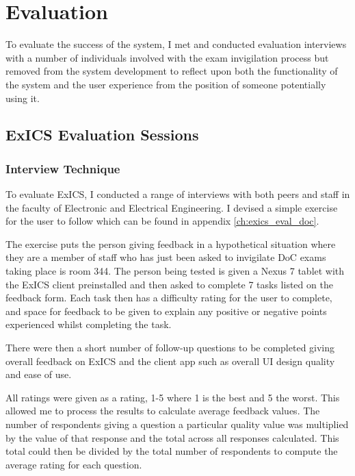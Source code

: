 \chapter{Evaluation}
\label{ch:eval}

To evaluate the success of the system, I met and conducted evaluation interviews with a number of individuals involved with the exam invigilation process but removed from the system development to reflect upon both the functionality of the system and the user experience from the position of someone potentially using it.

\section{ExICS Evaluation Sessions}

\subsection{Interview Technique}

To evaluate ExICS, I conducted a range of interviews with both peers and staff in the faculty of Electronic and Electrical Engineering.  I devised a simple exercise for the user to follow which can be found in appendix \ref{ch:exics_eval_doc}.

The exercise puts the person giving feedback in a hypothetical situation where they are a member of staff who has just been asked to invigilate DoC exams taking place is room 344.  The person being tested is given a Nexus 7 tablet with the ExICS client preinstalled and then asked to complete 7 tasks listed on the feedback form.  Each task then has a difficulty rating for the user to complete, and space for feedback to be given to explain any positive or negative points experienced whilst completing the task.

There were then a short number of follow-up questions to be completed giving overall feedback on ExICS and the client app such as overall UI design quality and ease of use.

All ratings were given as a rating, 1-5 where 1 is the best and 5 the worst.  This allowed me to process the results to calculate average feedback values.  The number of respondents giving a question a particular quality value was multiplied by the value of that response and the total across all responses calculated.  This total could then be divided by the total number of respondents to compute the average rating for each question.

